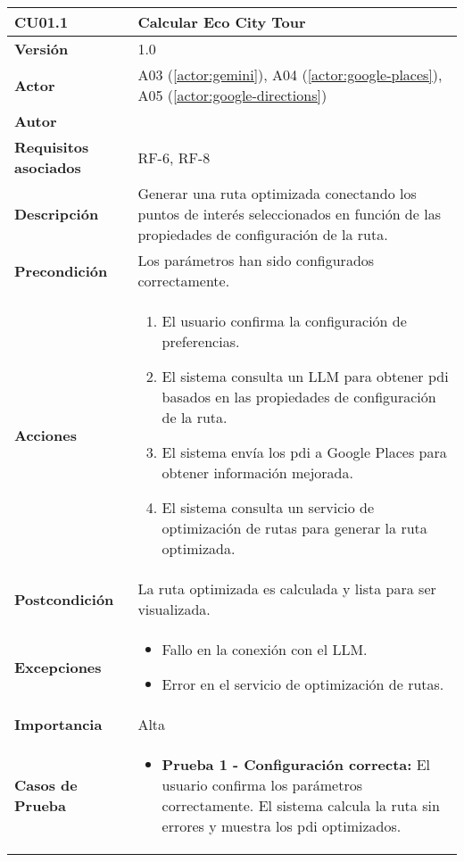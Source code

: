 \begin{table}[H]
	\centering
	\begin{tabularx}{\linewidth}{ p{} p{} }
		\toprule
		\textbf{CU01.1}    & \textbf{Calcular Eco City Tour} \\
		\toprule
		\textbf{Versión}              & 1.0    \\
		\textbf{Actor}                & A03 (\ref{actor:gemini}), A04 (\ref{actor:google-places}), A05 (\ref{actor:google-directions}) \\
		\textbf{Autor}                & \autor \\
		\textbf{Requisitos asociados} & RF-6, RF-8 \\
		\textbf{Descripción}          & Generar una ruta optimizada conectando los puntos de interés seleccionados en función de las propiedades de configuración de la ruta. \\
		\textbf{Precondición}         & Los parámetros han sido configurados correctamente. \\
		\textbf{Acciones}             &
		\begin{enumerate}
			\def\labelenumi{\arabic{enumi}.}
			\tightlist
			\item El usuario confirma la configuración de preferencias.
			\item El sistema consulta un LLM para obtener \acrshort{pdi} basados en las propiedades de configuración de la ruta.
			\item El sistema envía los \acrshort{pdi} a Google Places para obtener información mejorada.
			\item El sistema consulta un servicio de optimización de rutas para generar la ruta optimizada.
		\end{enumerate}\\
		\textbf{Postcondición}        & La ruta optimizada es calculada y lista para ser visualizada. \\
		\textbf{Excepciones}          & 
		\begin{itemize}
			\tightlist
			\item Fallo en la conexión con el LLM.
			\item Error en el servicio de optimización de rutas.
		\end{itemize}\\
		\textbf{Importancia}          & Alta \\
		\textbf{Casos de Prueba}      &
		\begin{itemize}
			\item \textbf{Prueba 1 - Configuración correcta:} El usuario confirma los parámetros correctamente. El sistema calcula la ruta sin errores y muestra los \acrlong{pdi} optimizados.

\end{itemize}
\end{tabularx}
\end{table}
